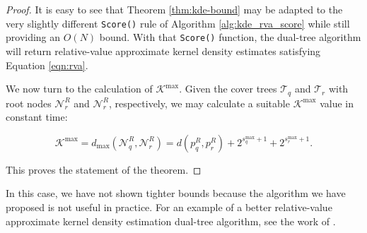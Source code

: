 \begin{proof}
It is easy to see that Theorem \ref{thm:kde-bound} may be adapted to the very
slightly different \texttt{Score()} rule of Algorithm \ref{alg:kde_rva_score}
while still providing an $O(N)$ bound.  With that \texttt{Score()} function, the
dual-tree algorithm will return relative-value approximate kernel density
estimates satisfying Equation \ref{eqn:rva}.

We now turn to the calculation of $\mathcal{K}^{\max}$.  Given the cover trees
$\mathscr{T}_q$ and $\mathscr{T}_r$ with root nodes $\mathscr{N}_{r}^{R}$ and
$\mathscr{N}_{r}^{R}$, respectively, we may calculate a suitable
$\mathcal{K}^{\max}$ value in constant time:

\begin{equation}
\mathcal{K}^{\max} = d_{\max}(\mathscr{N}_q^R, \mathscr{N}_r^R) = d(p_q^R,
p_r^R) + 2^{s_q^{\max} + 1} + 2^{s_r^{\max} + 1}.
\end{equation}

This proves the statement of the theorem.
\end{proof}

In this case, we have not shown tighter bounds because the algorithm we have
proposed is not useful in practice.  For an example of a better relative-value
approximate kernel density estimation dual-tree algorithm, see the work of
\citet{gray2003nonparametric}.
